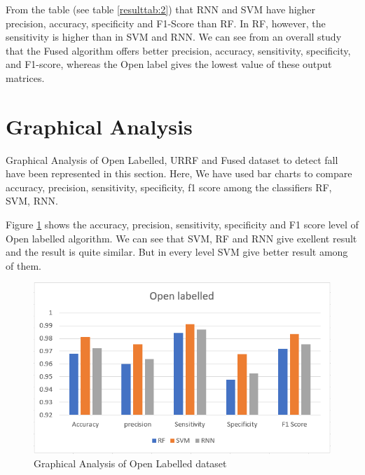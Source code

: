 \vspace{.5cm}
From the table (see table \ref{resulttab:2}) that RNN and SVM have higher precision, accuracy, specificity and F1-Score than RF. In RF, however, the sensitivity is higher than in SVM and RNN. We can see from an overall study that the Fused algorithm offers better precision, accuracy, sensitivity, specificity, and F1-score, whereas the Open label gives the lowest value of these output matrices.

\section{Graphical Analysis}
 Graphical Analysis of Open Labelled, URRF and Fused dataset to detect fall have been represented in this section. Here, We have used bar charts to compare accuracy, precision, sensitivity, specificity, f1 score among the classifiers RF, SVM, RNN.
 
 \vspace{0.5cm}
Figure \ref{fig:Chart 1} shows the accuracy, precision, sensitivity, specificity and F1 score level of Open labelled algorithm. We can see that SVM, RF and RNN give exellent result and the result is quite similar. But in every level SVM give better result among of them. 
\begin{figure}[!ht]
    \centering
    \includegraphics[scale=0.75]{Chap5/Bar 1.PNG}
    \caption{Graphical Analysis of Open Labelled dataset}
    \label{fig:Chart 1}
\end{figure}

